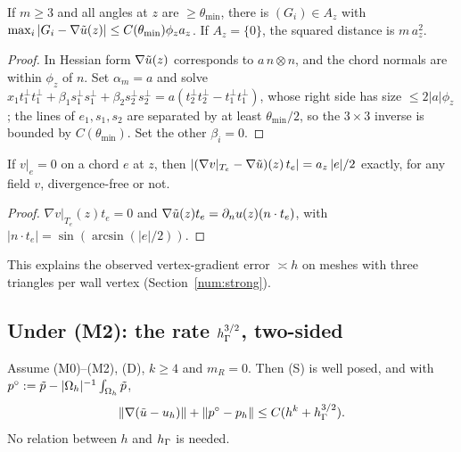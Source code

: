 \begin{lemma}\label{st:L3}
If $m\ge3$ and all angles at $z$ are $\ge\theta_{\min}$, there is $(G_i)\in A_z$ with $\max_i|G_i-\nabla\tilde u(z)|\le C(\theta_{\min})\phi_za_z$. If $A_z=\{0\}$, the squared distance is $m\,a_z^2$.
\end{lemma}

\begin{proof}
In Hessian form $\nabla\tilde u(z)$ corresponds to $a\,n\otimes n$, and the chord normals are within $\phi_z$ of $n$. Set $\alpha_m=a$ and solve $x_1t_1^\perp t_1^\perp+\beta_1s_1^\perp s_1^\perp+\beta_2s_2^\perp s_2^\perp=a(t_2^\perp t_2^\perp-t_1^\perp t_1^\perp)$, whose right side has size $\le2|a|\phi_z$; the lines of $e_1,s_1,s_2$ are separated by at least $\theta_{\min}/2$, so the $3\times3$ inverse is bounded by $C(\theta_{\min})$. Set the other $\beta_i=0$.
\end{proof}

\begin{lemma}\label{st:P1}
If $v|_e=0$ on a chord $e$ at $z$, then $|(\nabla v|_{T_e}-\nabla\tilde u)(z)\,t_e|=a_z\,|e|/2$ exactly, for any field $v$, divergence-free or not.
\end{lemma}

\begin{proof}
$\nabla v|_{T_e}(z)t_e=0$ and $\nabla\tilde u(z)t_e=\partial_n u(z)(n\cdot t_e)$, with $|n\cdot t_e|=\sin(\arcsin(|e|/2))$.
\end{proof}

This explains the observed vertex-gradient error $\asymp h$ on meshes with three triangles per wall vertex (Section~\ref{num:strong}).

\subsection{Under (M2): the rate \texorpdfstring{$h_\Gamma^{3/2}$}{h^(3/2)}, two-sided}

\begin{theorem}\label{st:S1}
Assume (M0)--(M2), (D), $k\ge4$ and $m_R=0$. Then (S) is well posed, and with $p^\circ:=\tilde p-|\Omega_h|^{-1}\int_{\Omega_h}\tilde p$,
\[
\lVert \nabla(\tilde u-u_h)\rVert+\lVert p^\circ-p_h\rVert\le C(h^k+h_\Gamma^{3/2}).
\]
No relation between $h$ and $h_\Gamma$ is needed.
\end{theorem}

